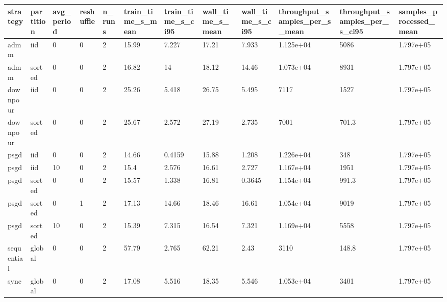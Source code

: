 \begin{tabular}{llllllllllll}
\hline
strategy & partition & avg\_period & reshuffle & n\_runs & train\_time\_s\_mean & train\_time\_s\_ci95 & wall\_time\_s\_mean & wall\_time\_s\_ci95 & throughput\_samples\_per\_s\_mean & throughput\_samples\_per\_s\_ci95 & samples\_processed\_mean \\
\hline
admm & iid & 0 & 0 & 2 & 15.99 & 7.227 & 17.21 & 7.933 & 1.125e+04 & 5086 & 1.797e+05 \\
admm & sorted & 0 & 0 & 2 & 16.82 & 14 & 18.12 & 14.46 & 1.073e+04 & 8931 & 1.797e+05 \\
downpour & iid & 0 & 0 & 2 & 25.26 & 5.418 & 26.75 & 5.495 & 7117 & 1527 & 1.797e+05 \\
downpour & sorted & 0 & 0 & 2 & 25.67 & 2.572 & 27.19 & 2.735 & 7001 & 701.3 & 1.797e+05 \\
psgd & iid & 0 & 0 & 2 & 14.66 & 0.4159 & 15.88 & 1.208 & 1.226e+04 & 348 & 1.797e+05 \\
psgd & iid & 10 & 0 & 2 & 15.4 & 2.576 & 16.61 & 2.727 & 1.167e+04 & 1951 & 1.797e+05 \\
psgd & sorted & 0 & 0 & 2 & 15.57 & 1.338 & 16.81 & 0.3645 & 1.154e+04 & 991.3 & 1.797e+05 \\
psgd & sorted & 0 & 1 & 2 & 17.13 & 14.66 & 18.46 & 16.61 & 1.054e+04 & 9019 & 1.797e+05 \\
psgd & sorted & 10 & 0 & 2 & 15.39 & 7.315 & 16.54 & 7.321 & 1.169e+04 & 5558 & 1.797e+05 \\
sequential & global & 0 & 0 & 2 & 57.79 & 2.765 & 62.21 & 2.43 & 3110 & 148.8 & 1.797e+05 \\
sync & global & 0 & 0 & 2 & 17.08 & 5.516 & 18.35 & 5.546 & 1.053e+04 & 3401 & 1.797e+05 \\
\hline
\end{tabular}

